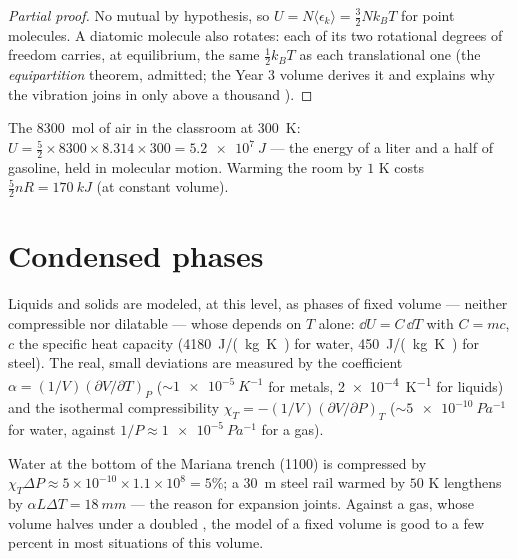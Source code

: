 \begin{proof}[Partial proof]
No mutual  by hypothesis, so $U = N\langle\epsilon_k\rangle
= \tfrac32 Nk_BT$ for point molecules. A diatomic molecule also rotates:
each of its two rotational degrees of freedom carries, at equilibrium,
the same $\tfrac12 k_BT$ as each translational one (the \emph{equipartition}
theorem, admitted; the Year 3 volume derives it and explains why the
vibration joins in only above a thousand ).
\end{proof}

\begin{example}\label{ex:b1:kinetic-theory:room}
The \qty{8300}{mol} of air in the classroom at \qty{300}{K}: $U = \tfrac52 \times
8300 \times 8.314 \times 300 = \qty{5.2e7}{J}$ --- the energy of a liter and a
half of gasoline, held in molecular motion. Warming the room by $1$ K
costs $\tfrac52 nR = \qty{170}{kJ}$ (at constant volume).
\end{example}

\section{Condensed phases}

\begin{proposition}\label{prop:b1:kinetic-theory:condensed}
Liquids and solids are modeled, at this level, as phases of fixed
volume --- neither compressible nor dilatable --- whose 
depends on $T$ alone: $\dd U = C\,\dd T$ with $C = mc$, $c$ the specific
heat capacity (\qty{4180}{J/(kg.K)} for water, \qty{450}{J/(kg.K)} for
steel). The real, small deviations are measured by the 
coefficient $\alpha = (1/V)(\partial V/\partial T)_P$ ($\sim\qty{1e-5}{K^{-1}}$
for metals, \qty{2e-4}{K^{-1}} for liquids) and the isothermal
compressibility $\chi_T = -(1/V)(\partial V/\partial P)_T$ ($\sim\qty{5e-10}{Pa^{-1}}$
for water, against $1/P \approx \qty{1e-5}{Pa^{-1}}$ for a gas).
\end{proposition}
\admitted

\begin{example}\label{ex:b1:kinetic-theory:water}
Water at the bottom of the Mariana trench (\qty{1100}{}) is compressed
by $\chi_T\Delta P \approx 5\times10^{-10} \times 1.1\times10^8 = 5\%$; a
\qty{30}{m} steel rail warmed by $50$ K lengthens by $\alpha L\Delta T =
\qty{18}{mm}$ --- the reason for expansion joints. Against a gas, whose
volume halves under a doubled , the model of a fixed volume is
good to a few percent in most situations of this volume.
\end{example}

